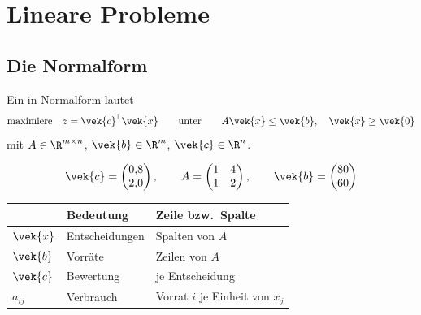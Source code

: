 \chapter{Lineare Probleme}

\section{Die Normalform}

\begin{definition}
Ein  in Normalform lautet
\[ \text{maximiere}\quad z = \vek{c}^{\!\top}\vek{x} \qquad\text{unter}\qquad A\vek{x} \le \vek{b}, \quad \vek{x} \ge \vek{0} \]
mit $A \in \R^{m\times n}$, $\vek{b} \in \R^m$, $\vek{c} \in \R^n$.
\end{definition}

\begin{merksatz}
\[ \vek{c} = \begin{pmatrix} 0{,}8\\ 2{,}0\end{pmatrix}, \qquad
A = \begin{pmatrix} 1 & 4\\ 1 & 2\end{pmatrix}, \qquad
\vek{b} = \begin{pmatrix} 80\\ 60\end{pmatrix} \]

\begin{center}
{\small
\renewcommand{\arraystretch}{1.48}
\begin{tabular}{@{}P{1.6cm}P{2.6cm}P{3.6cm}@{}}
\toprule
& \textbf{Bedeutung} & \textbf{Zeile bzw.\ Spalte}\\
\midrule
$\vek{x}$ & Entscheidungen & Spalten von $A$\\
$\vek{b}$ & Vorräte & Zeilen von $A$\\
$\vek{c}$ & Bewertung & je Entscheidung\\
$a_{ij}$ & Verbrauch & Vorrat $i$ je Einheit von $x_j$\\
\bottomrule
\end{tabular}}
\end{center}

\begin{center}
\begin{minipage}{0.88\textwidth}
\end{minipage}
\end{center}
\end{merksatz}

